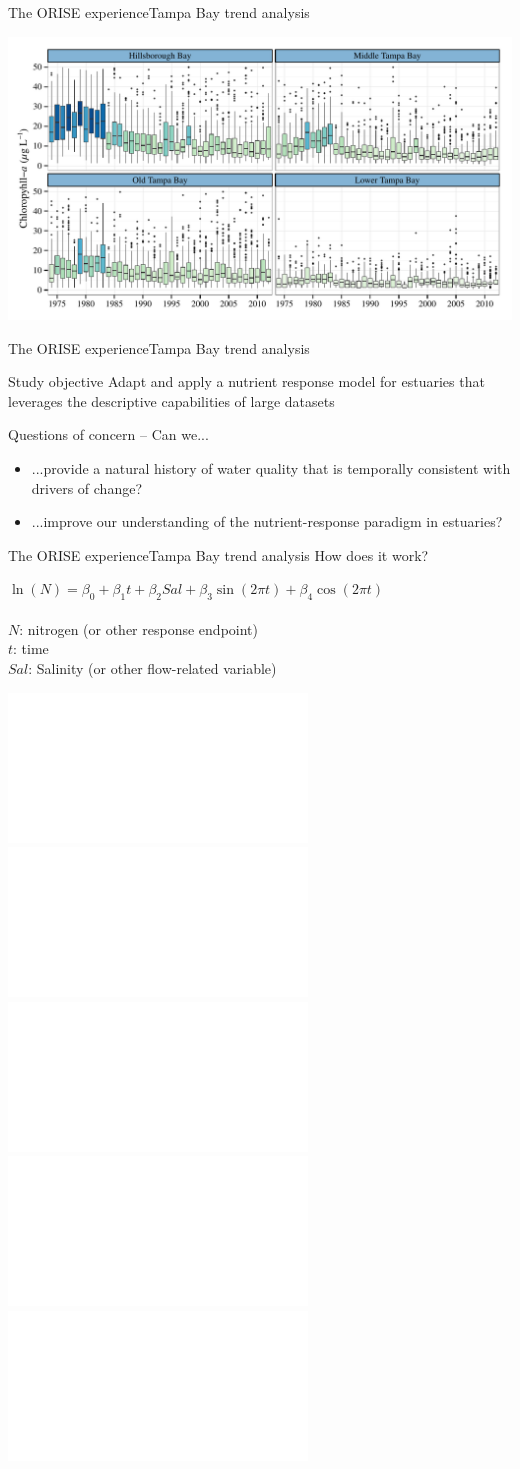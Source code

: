 \documentclass[serif]{beamer}\usepackage[]{graphicx}\usepackage[]{color}
\begin{document}
\begin{frame}{The ORISE experience}{Tampa Bay trend analysis}
\centerline{\includegraphics[width = \textwidth]{fig/annual_chl-1.pdf}}
\end{frame}

\begin{frame}{The ORISE experience}{Tampa Bay trend analysis}
\onslide<+->
\begin{block}{Study objective}
Adapt and apply a nutrient response model for estuaries that leverages the descriptive capabilities of large datasets \scriptsize \cite{Beck15}
\end{block}
\vspace{0.2in}
\onslide<+->
Questions of concern -- Can we...
\begin{itemize}
\item ...provide a natural history of water quality that is temporally consistent with drivers of change?
\onslide<+->
\item ...improve our understanding of the nutrient-response paradigm in estuaries?
\end{itemize}
\end{frame}

\begin{frame}[t]{The ORISE experience}{Tampa Bay trend analysis}
How does it work?  
\begin{center}
$\ln\left(N\right) = \beta_0 + \beta_1 t + \beta_2 Sal + \beta_3 \sin\left(2\pi t\right) + \beta_4 \cos\left(2\pi t\right)$\\~\\
$N$: nitrogen (or other response endpoint)\\
$t$: time\\
$Sal$: Salinity (or other flow-related variable)
\end{center}
\includegraphics<2>[width = \textwidth, page = 1]{fig/wrtds_pieces.pdf}
\includegraphics<3>[width = \textwidth, page = 2]{fig/wrtds_pieces.pdf}
\includegraphics<4>[width = \textwidth, page = 3]{fig/wrtds_pieces.pdf}
\includegraphics<5>[width = \textwidth, page = 4]{fig/wrtds_pieces.pdf}
\includegraphics<6>[width = \textwidth, page = 5]{fig/wrtds_pieces.pdf}
\end{frame}
\end{document}
